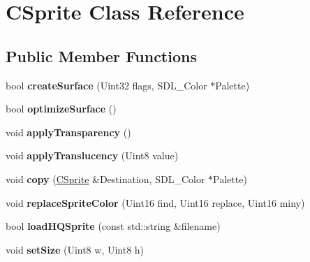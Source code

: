 \hypertarget{class_c_sprite}{
\section{CSprite Class Reference}
\label{class_c_sprite}
}
\subsection*{Public Member Functions}
\begin{DoxyCompactItemize}
\item 
\hypertarget{class_c_sprite_aa3b1e95e63d442ef6cc54abad6814c74}{
bool {\bfseries createSurface} (Uint32 flags, SDL\_\-Color $\ast$Palette)}
\label{class_c_sprite_aa3b1e95e63d442ef6cc54abad6814c74}

\item 
\hypertarget{class_c_sprite_ac8e8c33a2e32d6a2885b3a2d4cb950d1}{
bool {\bfseries optimizeSurface} ()}
\label{class_c_sprite_ac8e8c33a2e32d6a2885b3a2d4cb950d1}

\item 
\hypertarget{class_c_sprite_a1f0ab82472f6128adb3b4cb4c02aae41}{
void {\bfseries applyTransparency} ()}
\label{class_c_sprite_a1f0ab82472f6128adb3b4cb4c02aae41}

\item 
\hypertarget{class_c_sprite_abb6c8afd4944b10f59fce37eaf1d9dc6}{
void {\bfseries applyTranslucency} (Uint8 value)}
\label{class_c_sprite_abb6c8afd4944b10f59fce37eaf1d9dc6}

\item 
\hypertarget{class_c_sprite_ae2c89960cc1a487174935876dbd8850f}{
void {\bfseries copy} (\hyperlink{class_c_sprite}{CSprite} \&Destination, SDL\_\-Color $\ast$Palette)}
\label{class_c_sprite_ae2c89960cc1a487174935876dbd8850f}

\item 
\hypertarget{class_c_sprite_a7acdb2fe51e811f3d75b8a1252bae567}{
void {\bfseries replaceSpriteColor} (Uint16 find, Uint16 replace, Uint16 miny)}
\label{class_c_sprite_a7acdb2fe51e811f3d75b8a1252bae567}

\item 
\hypertarget{class_c_sprite_a0c8b8421e6c346a29c06e1e29c51ac81}{
bool {\bfseries loadHQSprite} (const std::string \&filename)}
\label{class_c_sprite_a0c8b8421e6c346a29c06e1e29c51ac81}

\item 
\hypertarget{class_c_sprite_a573a9af34d4ea1c4346d939fc913180e}{
void {\bfseries setSize} (Uint8 w, Uint8 h)}
\label{class_c_sprite_a573a9af34d4ea1c4346d939fc913180e}


\end{DoxyCompactItemize}

